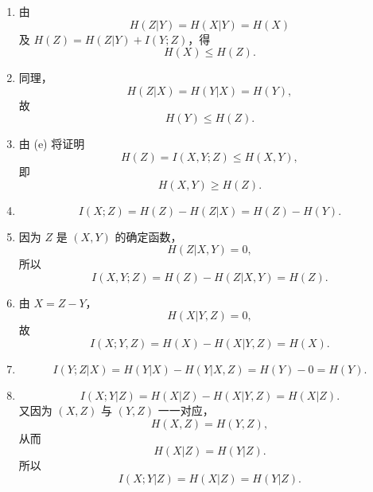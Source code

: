 \documentclass[UTF8,11pt,a4paper]{ctexart}
\begin{document}
\begin{enumerate}[label=\textnormal{(\alph*)}]
  \item 由
  \[
  H(Z|Y)=H(X|Y)=H(X)
  \]
  及 $H(Z)=H(Z|Y)+I(Y;Z)$，得
  \[
  H(X)\le H(Z).
  \]

  \item 同理，
  \[
  H(Z|X)=H(Y|X)=H(Y),
  \]
  故
  \[
  H(Y)\le H(Z).
  \]

  \item 由 (e) 将证明
  \[
  H(Z)=I(X,Y;Z)\le H(X,Y),
  \]
  即
  \[
  H(X,Y)\ge H(Z).
  \]

  \item
  \[
  I(X;Z)=H(Z)-H(Z|X)=H(Z)-H(Y).
  \]

  \item 因为 $Z$ 是 $(X,Y)$ 的确定函数，
  \[
  H(Z|X,Y)=0,
  \]
  所以
  \[
  I(X,Y;Z)=H(Z)-H(Z|X,Y)=H(Z).
  \]

  \item 由 $X=Z-Y$，
  \[
  H(X|Y,Z)=0,
  \]
  故
  \[
  I(X;Y,Z)=H(X)-H(X|Y,Z)=H(X).
  \]

  \item
  \[
  I(Y;Z|X)=H(Y|X)-H(Y|X,Z)=H(Y)-0=H(Y).
  \]

  \item
  \[
  I(X;Y|Z)=H(X|Z)-H(X|Y,Z)=H(X|Z).
  \]
  又因为 $(X,Z)$ 与 $(Y,Z)$ 一一对应，
  \[
  H(X,Z)=H(Y,Z),
  \]
  从而
  \[
  H(X|Z)=H(Y|Z).
  \]
  所以
  \[
  I(X;Y|Z)=H(X|Z)=H(Y|Z).
  \]
\end{enumerate}
\vspace{0.8em}
\end{document}
